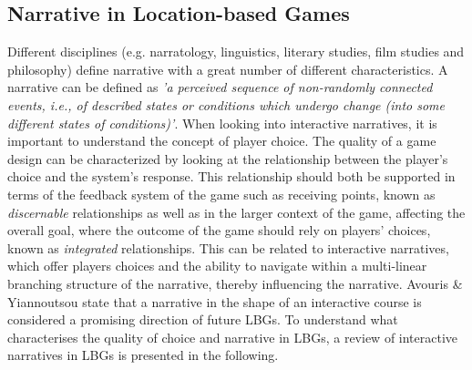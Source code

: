 \subsection{Narrative in Location-based Games}
Different disciplines (e.g. narratology, linguistics, literary studies, film studies and philosophy) define narrative with a great number of different characteristics\cite{Grimaldi}. A narrative can be defined as \emph{'a perceived sequence of non-randomly connected events, i.e., of described states or conditions which undergo change (into some different states of conditions)'}\cite{narrativeDef}. When looking into interactive narratives, it is important to understand the concept of player choice. The quality of a game design can be characterized by looking at the relationship between the player’s choice and the system’s response\cite{RulesofPlay}. This relationship should both be supported in terms of the feedback system of the game such as receiving points, known as \textit{discernable} relationships as well as in the larger context of the game, affecting the overall goal, where the outcome of the game should rely on players' choices, known as \textit{integrated} relationships\cite{RulesofPlay}. This can be related to interactive narratives, which offer players choices and the ability to navigate within a multi-linear branching structure of the narrative, thereby influencing the narrative\cite{ryanavatars}. Avouris \& Yiannoutsou state that a narrative in the shape of an interactive course is considered a promising direction of future LBGs\cite{LBG_Review}. To understand what characterises the quality of choice and narrative in LBGs, a review of interactive narratives in LBGs is presented in the following.

